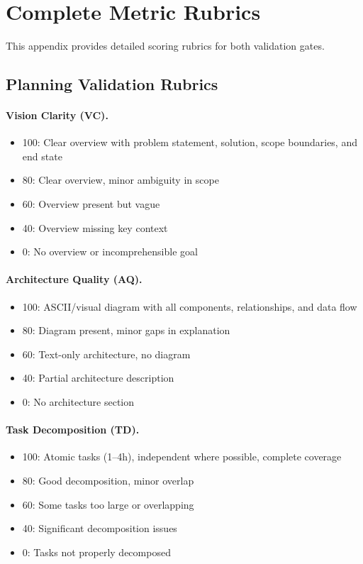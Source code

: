 \section{Complete Metric Rubrics}
\label{sec:appendix-metrics}

This appendix provides detailed scoring rubrics for both validation gates.

\subsection{Planning Validation Rubrics}

\paragraph{Vision Clarity (VC).}
\begin{itemize}
    \item 100: Clear overview with problem statement, solution, scope boundaries,
    and end state
    \item 80: Clear overview, minor ambiguity in scope
    \item 60: Overview present but vague
    \item 40: Overview missing key context
    \item 0: No overview or incomprehensible goal
\end{itemize}

\paragraph{Architecture Quality (AQ).}
\begin{itemize}
    \item 100: ASCII/visual diagram with all components, relationships, and data flow
    \item 80: Diagram present, minor gaps in explanation
    \item 60: Text-only architecture, no diagram
    \item 40: Partial architecture description
    \item 0: No architecture section
\end{itemize}

\paragraph{Task Decomposition (TD).}
\begin{itemize}
    \item 100: Atomic tasks (1--4h), independent where possible, complete coverage
    \item 80: Good decomposition, minor overlap
    \item 60: Some tasks too large or overlapping
    \item 40: Significant decomposition issues
    \item 0: Tasks not properly decomposed
\end{itemize}

